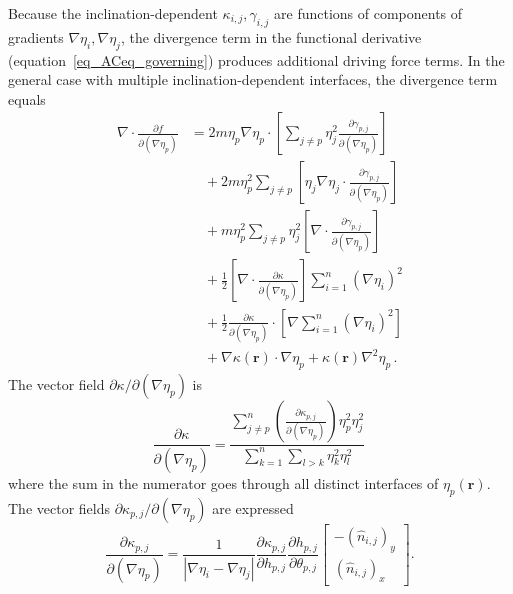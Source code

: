 		Because the inclination-dependent $\kappa_{i,j},\gamma_{i,j}$ are functions of components of gradients $\nabla\eta_i,\nabla\eta_j$, the divergence term in the functional derivative (equation~\eqref{eq_ACeq_governing}) produces additional driving force terms. In the general case with multiple inclination-dependent interfaces, the divergence term equals
		\begin{equation}\label{eq_incldep_divDFterms}
			\begin{split}
				\nabla\cdot \frac{\partial f}{\partial(\nabla \eta_p)} &= 2m\eta_p\nabla\eta_p\cdot \left[\sum_{j\neq p}  \eta_j^2\frac{\partial \gamma_{p,j}}{\partial (\nabla\eta_p)}\right]  \\ 
				&\quad+ 2m\eta_p^2\sum_{j\neq p} \left[\eta_j\nabla\eta_j \cdot \frac{\partial \gamma_{p,j}}{\partial (\nabla\eta_p)}\right] \\
				&\quad+ m\eta_p^2\sum_{j\neq p}\eta_j^2\left[\nabla\cdot\frac{\partial \gamma_{p,j}}{\partial (\nabla\eta_p)}\right] \\
				&\quad + \frac{1}{2}\left[\nabla\cdot\frac{\partial \kappa}{\partial (\nabla\eta_p)}\right]\sum_{i=1}^n(\nabla \eta_i)^2 \\
				&\quad+ \frac{1}{2}\frac{\partial \kappa}{\partial (\nabla\eta_p)}\cdot\left[\nabla\sum_{i=1}^n(\nabla \eta_i)^2\right]  \\
				&\quad+ \nabla\kappa(\bm{r})\cdot\nabla\eta_p + \kappa(\bm{r})\nabla^2\eta_p \,.
			\end{split} 
		\end{equation}
		The vector field $\partial \kappa/\partial(\nabla\eta_p)$ is
		\begin{equation} \label{eq_dkppdGp}
			\frac{\partial \kappa}{\partial(\nabla\eta_p)} =  \frac{\sum\limits_{j\neq p}^n \left(\frac{\partial \kappa_{p,j}}{\partial (\nabla\eta_p)}\right)\eta_p^2\eta_j^2}{\sum\limits_{k=1}^n\sum\limits_{l>k}\eta_k^2\eta_l^2} \,
		\end{equation}
		where the sum in the numerator goes through all distinct interfaces of $\eta_p(\bm{r})$. The vector fields $\partial\kappa_{p,j}/\partial (\nabla\eta_p)$ are expressed
		\begin{equation} \label{eq_dkppijdGp}
			\frac{\partial \kappa_{p,j}}{\partial (\nabla\eta_p)} = \frac{1}{|\nabla\eta_i-\nabla\eta_j|}\frac{\partial \kappa_{p,j}}{\partial h_{p,j}}\frac{\partial h_{p,j}}{\partial \theta_{p,j}} \left[\begin{array}{c}
				-(\hat{n}_{i,j})_y   \\
				(\hat{n}_{i,j})_x
			\end{array} \right].
		\end{equation}
